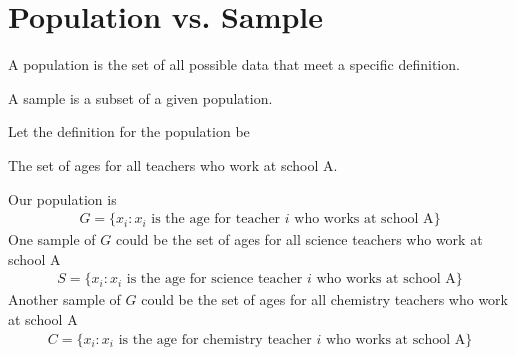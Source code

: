 \section{Population vs. Sample}

\begin{definition}
A population is the set of all possible data that meet a specific definition. 
\end{definition}

\begin{definition}
A sample is a subset of a given population.
\end{definition}

\begin{example}
Let the definition for the population be
\begin{center}
    The set of ages for all teachers who work at school A.
\end{center}
Our population is 
\begin{align*}
    G = \{x_{i}: x_{i} \hspace{4pt} \text{is the age for teacher} \hspace{4pt} i \hspace{4pt} \text{who works at school A}\}
\end{align*}
One sample of $G$ could be the set of ages for all science teachers who work at school A
\begin{align*}
    S = \{x_{i}: x_{i} \hspace{4pt} \text{is the age for science teacher} \hspace{4pt} i \hspace{4pt} \text{who works at school A}\}
\end{align*}
Another sample of $G$ could be the set of ages for all chemistry teachers who work at school A
\begin{align*}
    C = \{x_{i}: x_{i} \hspace{4pt} \text{is the age for chemistry teacher} \hspace{4pt} i \hspace{4pt} \text{who works at school A}\}
\end{align*}
\end{example}


